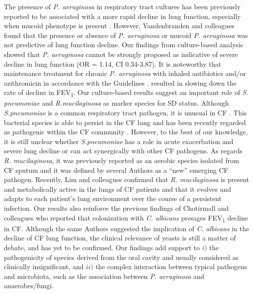 The presence of \textit{P. aeruginosa} in respiratory tract cultures has been previously reported to be associated with a more rapid decline in lung function, especially when mucoid phenotype is present \cite{emerson2002pseudomonas}. However, Vandenbranden and colleagues \cite{vandenbranden2012lung} found that the presence or absence of \textit{P. aeruginosa} or mucoid \textit{P. aeruginosa} was not predictive of lung function decline. Our findings from culture-based analysis showed that \textit{P. aeruginosa} cannot be strongly proposed as indicative of severe decline in lung function (OR = 1.14, CI 0.34-3.87). It is noteworthy that maintenance treatment for chronic \textit{P. aeruginosa} with inhaled antibiotics and/or azithromicin in accordance with the Guidelines \cite{34}. resulted in slowing down the rate of decline in FEV\textsubscript{1}. Our culture-based results suggest an important role of \textit{S. pneumoniae} and \textit{R.mucilaginosa} as marker species for SD status. Although \textit{S.pneumoniae} is a common respiratory tract pathogen, it is unusual in CF \cite{foweraker2009recent}. This bacterial species is able to persist in the CF lung and has been recently regarded as pathogenic within the CF community \cite{maeda2011population}. However, to the best of our knowledge, it is still unclear whether \textit{S.pneumoniae} has a role in acute exacerbation and severe lung decline or can act synergically with other CF pathogens. As regards \textit{R. mucilaginosa}, it was previously reported as an aerobic species isolated from CF sputum \cite{tunney2008detection} and it was defined by several Authors \cite{bittar2008molecular} \cite{39} as a ``new'' emerging CF pathogen. Recently, Lim and colleagues \cite{lim2013mechanistic} confirmed that \textit{R. mucilaginosa} is present and metabolically active in the lungs of CF patients and that it evolves and adapts to each patient's lung environment over the course of a persistent infection. Our results also reinforce the previous findings of Chotirmall and colleagues \cite{chotirmall2010sputum} who reported that colonization with \textit{C. albicans} presages FEV\textsubscript{1} decline in CF. Although the same Authors suggested the implication of \textit{C. albicans} in the decline of CF lung function, the clinical relevance of yeasts is still a matter of debate, and has yet to be confirmed. Our findings add support to $i)$ the pathogenicity of species derived from the oral cavity and usually considered as clinically insignificant, and $ii)$ the complex interaction between typical pathogens and microbiota, such as the association between \textit{P. aeruginosa} and anaerobes/fungi.\\
